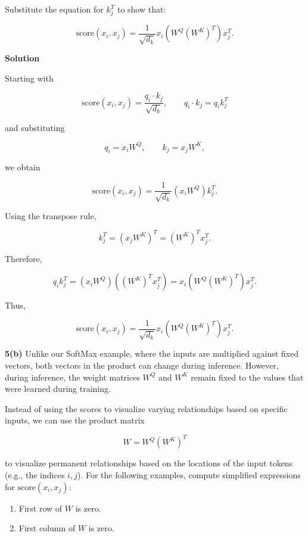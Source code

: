 \documentclass[12pt]{article}
\begin{document}
	Substitute the equation for \(k_j^T\) to show that:
	
	\[
	\mathrm{score}(x_i,x_j)
	=
	\frac{1}{\sqrt{d_k}}
	x_i
	\left(
	W^Q(W^K)^T
	\right)
	x_j^T.
	\]
	
	\noindent\textbf{Solution}
	
	Starting with
	
	\[
	\mathrm{score}(x_i,x_j)
	=
	\frac{q_i\cdot k_j}{\sqrt{d_k}},
	\qquad
	q_i\cdot k_j=q_i k_j^T
	\]
	
	and substituting
	
	\[
	q_i=x_iW^Q,
	\qquad
	k_j=x_jW^K,
	\]
	
	we obtain
	
	\[
	\mathrm{score}(x_i,x_j)
	=
	\frac{1}{\sqrt{d_k}}
	(x_iW^Q)k_j^T.
	\]
	
	Using the transpose rule,
	
	\[
	k_j^T
	=
	(x_jW^K)^T
	=
	(W^K)^T x_j^T.
	\]
	
	Therefore,
	
	\[
	q_i k_j^T
	=
	(x_iW^Q)\left((W^K)^T x_j^T\right)
	=
	x_i\left(W^Q(W^K)^T\right)x_j^T.
	\]
	
	Thus,
	
	\[
	\mathrm{score}(x_i,x_j)
	=
	\frac{1}{\sqrt{d_k}}
	x_i
	\left(
	W^Q(W^K)^T
	\right)
	x_j^T.
	\]
	
	\newpage
	
	\noindent\textbf{5(b)} Unlike our SoftMax example, where the inputs are multiplied against fixed vectors, both vectors in the product can change during inference. However, during inference, the weight matrices \(W^Q\) and \(W^K\) remain fixed to the values that were learned during training.
	
	Instead of using the scores to visualize varying relationships based on specific inputs, we can use the product matrix
	
	\[
	W = W^Q(W^K)^T
	\]
	
	to visualize permanent relationships based on the locations of the input tokens (e.g., the indices \(i,j\)). For the following examples, compute simplified expressions for \(\mathrm{score}(x_i,x_j)\):
	
	\begin{enumerate}[itemsep=8pt]
		
		\item[(i)] First row of \(W\) is zero.
		
		\item[(ii)] First column of \(W\) is zero.
		
	\end{enumerate}
	
\end{document}
